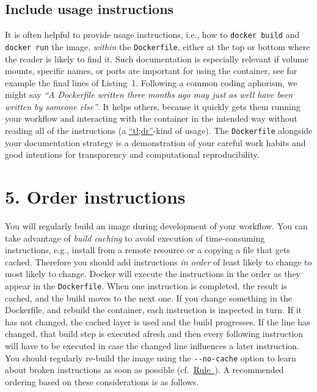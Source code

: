 \documentclass[10pt,letterpaper]{article}
\begin{document}
\hypertarget{include-usage-instructions}{%
\subsection{Include usage
instructions}\label{include-usage-instructions}}

It is often helpful to provide usage instructions, i.e., how to
\texttt{docker\ build} and \texttt{docker\ run} the image, \emph{within}
the \texttt{Dockerfile}, either at the top or bottom where the reader is
likely to find it. Such documentation is especially relevant if volume
mounts, specific names, or ports are important for using the container,
see for example the final lines of Listing~1. Following a common coding
aphorism, we might say \emph{``A Dockerfile written three months ago may
just as well have been written by someone else''}. It helps others,
because it quickly gets them running your workflow and interacting with
the container in the intended way without reading all of the
instructions (a
\href{https://en.wikipedia.org/wiki/Wikipedia:Too_long;_didn\%27t_read}{``tl;dr''}-kind
of usage). The \texttt{Dockerfile} alongside your documentation strategy
is a demonstration of your careful work habits and good intentions for
transparency and computational reproducibility.

\hypertarget{order-instructions}{%
\section{5. Order instructions}\label{order-instructions}}

  \label{rule:order} 

You will regularly build an image during development of your workflow.
You can take advantage of \emph{build caching} to avoid execution of
time-consuming instructions, e.g., install from a remote resource or a
copying a file that gets cached. Therefore you should add instructions
\emph{in order} of least likely to change to most likely to change.
Docker will execute the instructions in the order as they appear in the
\texttt{Dockerfile}. When one instruction is completed, the result is
cached, and the build moves to the next one. If you change something in
the Dockerfile, and rebuild the container, each instruction is inspected
in turn. If it has not changed, the cached layer is used and the build
progresses. If the line has changed, that build step is executed afresh
and then every following instruction will have to be executed in case
the changed line influences a later instruction. You should regularly
re-build the image using the \texttt{-\/-no-cache} option to learn about
broken instructions as soon as possible
(cf.~\hyperref[{rule:usage}]{Rule~}). A
recommended ordering based on these considerations is as follows.
\end{document}
